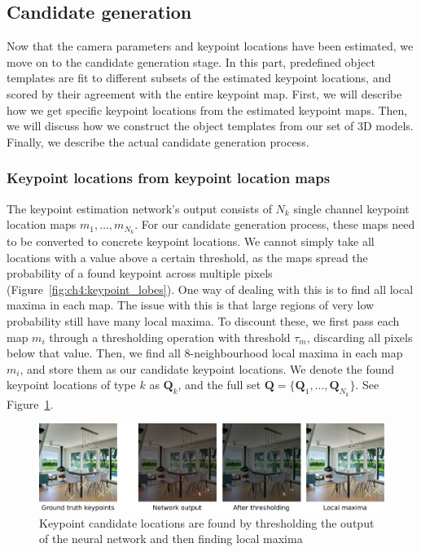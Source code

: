 \documentclass[10pt,twocolumn,letterpaper]{article}
\newcommand{\bb}[1]{{\bm{#1}}}
\begin{document}
\subsection{Candidate generation}
\label{sec:ch4:candidate_generation}
Now that the camera parameters and keypoint locations have been estimated, we
move on to the candidate generation stage. In this part, predefined object templates
are fit to different subsets of the estimated keypoint locations, and scored
by their agreement with the entire keypoint map. First, we will describe how we get specific
keypoint locations from the estimated keypoint maps. Then, we will discuss how we construct
the object templates from our set of 3D models. Finally, we describe the actual
candidate generation process.

\subsubsection{Keypoint locations from keypoint location maps}
The keypoint estimation network's output consists of $N_k$ single channel
keypoint location maps $m_1, \ldots, m_{N_k}$. For our candidate generation process, these maps need
to be converted to concrete keypoint locations. We cannot simply take all
locations with a value above a certain threshold, as the maps spread the
probability of a found keypoint across multiple pixels (Figure~\ref{fig:ch4:keypoint_lobes}).  One way of dealing
with this is to find all local maxima in each map. The issue with this is that
large regions of very low probability still have many local maxima. To discount
these, we first pass each map $m_i$ through a thresholding operation with
threshold $\tau_m$, discarding all pixels below that value.  Then, we find all
8-neighbourhood local maxima in each map $m_i$, and store them as our candidate keypoint
locations. We denote the found keypoint locations of type $k$ as $\bb{Q}_k$, and the
full set $\bb{Q} = \{\bb{Q}_1, \ldots, \bb{Q}_{N_k}\}$.  See
Figure~\ref{fig:ch4:keypoint_map_to_keypoints}.

\begin{figure}[h!tb]
    \includegraphics[width=\linewidth]{figures/keypoint_map_to_keypoints/keypoint_map_to_keypoints}
    \caption[Keypoint map postprocessing]{Keypoint candidate locations are found by thresholding the output of the neural network and then finding local maxima}
    \label{fig:ch4:keypoint_map_to_keypoints}
\end{figure}
\end{document}
